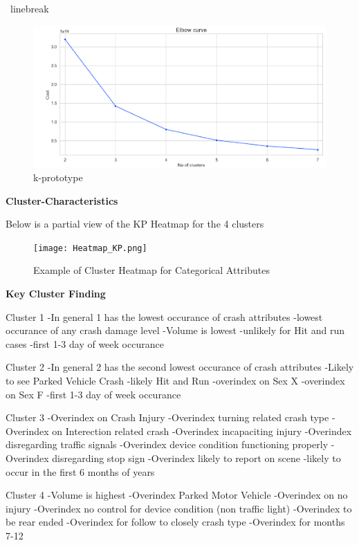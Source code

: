 \documentclass[conference]{IEEEtran}
\begin{document}
\begin{center}
\ linebreak
 \begin{figure}[!h]
	\includegraphics[width=\linewidth]{KPrototype_Elbow.png}
	\caption{k-prototype}
	\label{fig: kprototype elbow chart}
 \end{figure}

\textbf{Cluster-Characteristics} \linebreak

Below is a partial view of the KP Heatmap for the 4 clusters

\begin{figure}[!h]
	\texttt{[image: Heatmap\_KP.png]}
	\caption{Example of Cluster Heatmap for Categorical Attributes }
	\label{fig: Cluster Heatmap for Categorical Attributes (4 Clusters)}
\end{figure}

\begin{center} 
	\textbf{Key Cluster Finding} 
	\end{center}

Cluster 1
-In general 1 has the lowest occurance of crash attributes
-lowest occurance of any crash damage level
-Volume is lowest
-unlikely for Hit and run cases
-first 1-3 day of week occurance

Cluster 2
-In general 2 has the second lowest occurance of crash attributes
-Likely to see Parked Vehicle Crash
-likely Hit and Run
-overindex on Sex X
-overindex on Sex F
-first 1-3 day of week occurance

Cluster 3
-Overindex on Crash Injury
-Overindex turning related crash type
-Overindex on Interection related crash
-Overindex incapaciting injury
-Overindex disregarding traffic signals
-Overindex device condition functioning properly
-Overindex disregarding stop sign
-Overindex likely to report on scene
-likely to occur in the first 6 months of years

Cluster 4
-Volume is highest
-Overindex Parked Motor Vehicle
-Overindex on no injury
-Overindex no control for device condition (non traffic light)
-Overindex to be rear ended
-Overindex for follow to closely crash type
-Overindex for months 7-12


\end{center}
\end{document}
